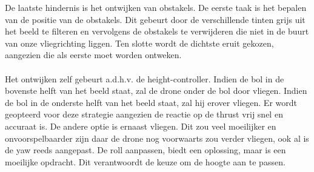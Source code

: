 \noindent
De laatste hindernis is het ontwijken van obstakels. De eerste taak is het bepalen van de positie van de obstakels. Dit gebeurt door de verschillende tinten grijs uit het beeld te filteren en vervolgens de obstakels te verwijderen die niet in de buurt van onze vliegrichting liggen. Ten slotte wordt de dichtste eruit gekozen, aangezien die als eerste moet worden ontweken.
\\
\\
Het ontwijken zelf gebeurt a.d.h.v. de height-controller. Indien de bol in de bovenste helft van het beeld staat, zal de drone onder de bol door vliegen. Indien de bol in de onderste helft van het beeld staat, zal hij erover vliegen. Er wordt geopteerd voor deze strategie aangezien de reactie op de thrust vrij snel en accuraat is. De andere optie is ernaast vliegen. Dit zou veel moeilijker en onvoorspelbaarder zijn daar de drone nog voorwaarts zou verder vliegen, ook al is de yaw reeds aangepast. De roll aanpassen, biedt een oplossing, maar is een moeilijke opdracht. Dit verantwoordt de keuze om de hoogte aan te passen.